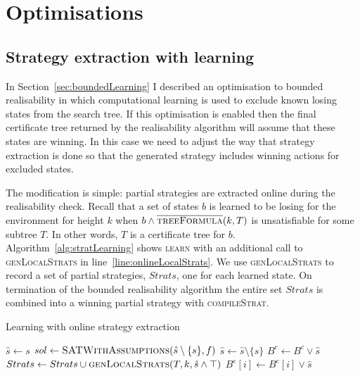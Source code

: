 \section{Optimisations}

\subsection{Strategy extraction with learning}

In Section~\ref{sec:boundedLearning} I described an optimisation to bounded realisability in which computational learning is used to exclude known losing states from the search tree. If this optimisation is enabled then the final certificate tree returned by the realisability algorithm will assume that these states are winning. In this case we need to adjust the way that strategy extraction is done so that the generated strategy includes winning actions for excluded states. 

The modification is simple: partial strategies are extracted online during the realisability check. Recall that a set of states $b$ is learned to be losing for the environment for height $k$ when $b \land \textsc{$\overline{\mbox{treeFormula}}$}(k, T)$ is unsatisfiable for some subtree $T$. In other words, $T$ is a certificate tree for $b$. Algorithm~\ref{alg:stratLearning} shows \textsc{learn} with an additional call to \textsc{genLocalStrats} in line~\ref{line:onlineLocalStrats}.  We use \textsc{genLocalStrats} to record a set of partial strategies, $Strats$, one for each learned state. On termination of the bounded realisability algorithm the entire set $Strats$ is combined into a winning partial strategy with \textsc{compileStrat}.

\begin{algorithm}
    \caption{Learning with online strategy extraction}
    \label{alg:stratLearning}
    \begin{algorithmic}
            \State $ \hat{s} \gets s$
            \State $sol \gets \Call{SATWithAssumptions}{\hat{s} \setminus \{ s \}, f}$
                    \State $\hat{s} \gets \hat{s} \setminus \{ s \}$
                \EndIf
            \EndFor
                \State $B^c \gets B^c \lor \hat{s}$
            \Else
                \State $Strats \gets Strats \cup \Call{genLocalStrats}{T, k, \hat{s} \land \top}$ \label{line:onlineLocalStrats}
                    \State $B^e[i] \gets B^e[i] \lor \hat{s}$
                \EndFor
            \EndIf
        \EndFunction
    \end{algorithmic}
\end{algorithm}

